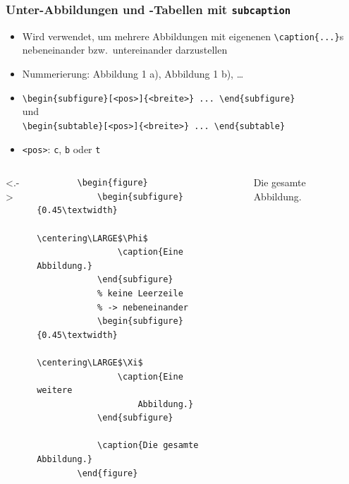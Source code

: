 \begin{frame}[<+->][fragile]
	\frametitle{Unter-Abbildungen und -Tabellen mit \texttt{subcaption}}
	\begin{itemize}
		\item Wird verwendet, um mehrere Abbildungen mit eigenenen \lstinline!\caption{...}!s nebeneinander bzw.\ untereinander darzustellen
		\item Nummerierung: Abbildung 1 a), Abbildung 1 b), \dots
		\item \lstinline!\begin{subfigure}[<pos>]{<breite>} ... \end{subfigure}!\\
		und\\
		\lstinline!\begin{subtable}[<pos>]{<breite>} ... \end{subtable}!
		\item \lstinline!<pos>!: \lstinline!c!, \lstinline!b! oder \lstinline!t!
	\end{itemize}
\end{frame}


\begin{frame}[<+->][fragile]
	\begin{columns}<.->
		\lstset{basicstyle=\footnotesize\ttfamily, frame=L, numbers=left, xleftmargin=0.5cm}
		\begin{lstlisting}
		\begin{figure}
		    \begin{subfigure}{0.45\textwidth}
		        \centering\LARGE$\Phi$
		        \caption{Eine Abbildung.}
		    \end{subfigure}
		    % keine Leerzeile
		    % -> nebeneinander
		    \begin{subfigure}{0.45\textwidth}
		        \centering\LARGE$\Xi$
		        \caption{Eine weitere
		            Abbildung.}
		    \end{subfigure}
		    
		    \caption{Die gesamte Abbildung.}
		\end{figure}
		\end{lstlisting}
		\begin{figure}

			\caption{Die gesamte Abbildung.}
		\end{figure}
	\end{columns}
	
	\bigskip
\end{frame}

